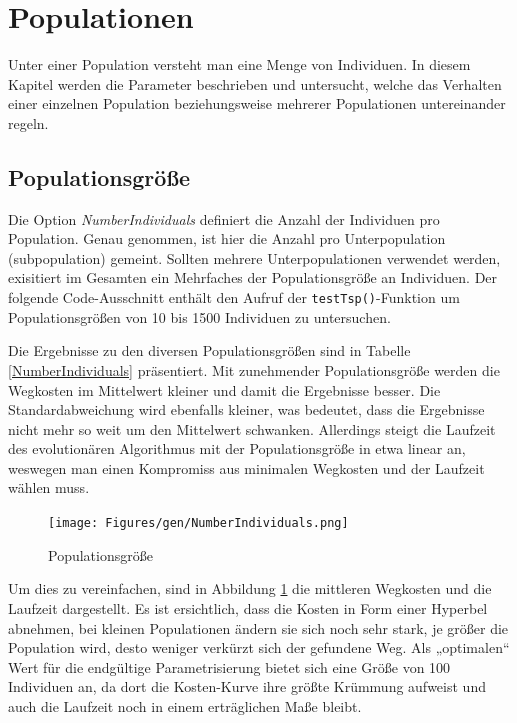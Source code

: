\section{Populationen}\label{populations}


Unter einer Population versteht man eine Menge von Individuen. In diesem Kapitel
werden die Parameter beschrieben und untersucht, welche das Verhalten einer
einzelnen Population beziehungsweise mehrerer Populationen untereinander regeln.

\subsection{Populationsgröße}
Die Option \emph{NumberIndividuals} definiert die Anzahl der Individuen
pro Population. Genau genommen, ist hier die Anzahl pro Unterpopulation
(subpopulation) gemeint. Sollten mehrere Unterpopulationen verwendet werden,
exisitiert im Gesamten ein Mehrfaches der Populationsgröße an Individuen.
Der folgende Code-Ausschnitt enthält den Aufruf der {\tt testTsp()}-Funktion um
Populationsgrößen von 10 bis 1500 Individuen zu untersuchen.





\noindent Die Ergebnisse zu den diversen Populationsgrößen sind in Tabelle
\ref{NumberIndividuals} präsentiert. Mit zunehmender Populationsgröße werden die
Wegkosten im Mittelwert kleiner und damit die Ergebnisse besser.
Die Standardabweichung wird ebenfalls kleiner, was bedeutet, dass die Ergebnisse
nicht mehr so weit um den Mittelwert schwanken. Allerdings steigt die Laufzeit
des evolutionären Algorithmus mit der Populationsgröße in etwa linear an,
weswegen man einen Kompromiss aus minimalen Wegkosten und der Laufzeit wählen
muss.

\begin{figure}[h!]
  \centering
  \texttt{[image: Figures/gen/NumberIndividuals.png]}
  \caption{Populationsgröße}\label{fig.numberindividuals}
\end{figure}

Um dies zu vereinfachen, sind in Abbildung \ref{fig.numberindividuals} die
mittleren Wegkosten und die Laufzeit dargestellt. Es ist ersichtlich, dass die
Kosten in Form einer Hyperbel abnehmen, bei kleinen Populationen ändern sie sich
noch sehr stark, je größer die Population wird, desto weniger verkürzt sich der
gefundene Weg. Als „optimalen“ Wert für die endgültige Parametrisierung bietet
sich eine Größe von 100 Individuen an, da dort die Kosten-Kurve ihre größte
Krümmung aufweist und auch die Laufzeit noch in einem erträglichen Maße bleibt.


